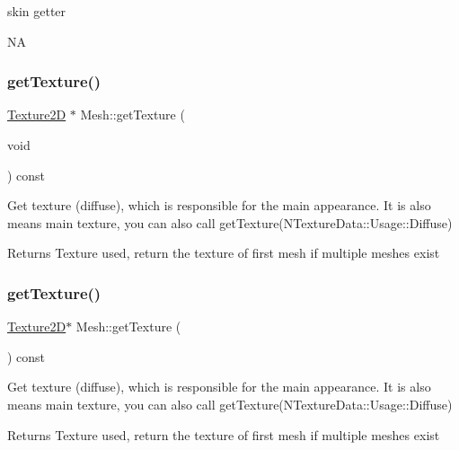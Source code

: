 skin getter

NA \mbox{\label{classMesh_a61b42530666a384edab7e03dd480e15c}} 
\subsubsection{\texorpdfstring{get\+Texture()}{getTexture()}\hspace{0.1cm}{\footnotesize\ttfamily [1/4]}}
{\footnotesize\ttfamily \hyperlink{classTexture2D}{Texture2D} $\ast$ Mesh\+::get\+Texture (\begin{DoxyParamCaption}\item[{void}]{ }\end{DoxyParamCaption}) const}

Get texture (diffuse), which is responsible for the main appearance. It is also means main texture, you can also call get\+Texture(\+N\+Texture\+Data\+::\+Usage\+::\+Diffuse) \begin{DoxyReturn}{Returns}
Texture used, return the texture of first mesh if multiple meshes exist 
\end{DoxyReturn}
\mbox{\label{classMesh_a50d6d1de8a7cafa24743acf6de58f1e8}} 
\subsubsection{\texorpdfstring{get\+Texture()}{getTexture()}\hspace{0.1cm}{\footnotesize\ttfamily [2/4]}}
{\footnotesize\ttfamily \hyperlink{classTexture2D}{Texture2D}$\ast$ Mesh\+::get\+Texture (\begin{DoxyParamCaption}{ }\end{DoxyParamCaption}) const}

Get texture (diffuse), which is responsible for the main appearance. It is also means main texture, you can also call get\+Texture(\+N\+Texture\+Data\+::\+Usage\+::\+Diffuse) \begin{DoxyReturn}{Returns}
Texture used, return the texture of first mesh if multiple meshes exist 
\end{DoxyReturn}
\mbox{\label{classMesh_a814f535d4ce6b3243d3319aa18788ee8}} 

